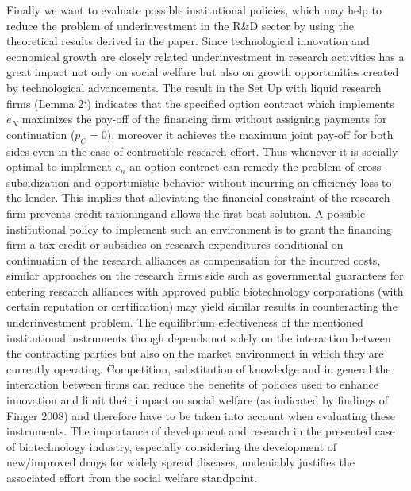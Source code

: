 Finally we want to evaluate possible institutional policies, which may help to reduce the problem of underinvestment in the R\&D sector by using the theoretical results derived in the paper. Since technological innovation and economical growth are closely related underinvestment in research activities has a great impact not only on social welfare but also on growth opportunities created by technological advancements. The result in the Set Up with liquid research firms (Lemma 2`) indicates that the specified option contract  which implements $e_N$ maximizes the pay-off of the financing firm without assigning payments for continuation ($p_C = 0$), moreover it achieves the maximum joint pay-off for both sides even in the case of contractible research effort. Thus whenever it is socially optimal to implement $e_n$  an option contract can remedy the problem of cross-subsidization and opportunistic behavior without incurring an efficiency loss to the lender. This implies that alleviating the financial constraint of the research firm prevents \grqq credit rationing\grqq and allows the first best solution. A possible institutional policy to implement such an environment is to grant the financing firm a tax credit or subsidies on research expenditures conditional on continuation of the research alliances as compensation for the incurred costs, similar approaches on the research firms side such as governmental guarantees for entering research alliances with approved public biotechnology corporations (with certain reputation or certification) may yield similar results in counteracting the underinvestment problem. The equilibrium effectiveness of the mentioned institutional instruments though depends not solely on the interaction between the contracting parties but also on the market environment in which they are currently operating. Competition, substitution of knowledge and in general the interaction between firms can reduce the benefits of policies used to enhance innovation and limit their impact on social welfare (as indicated by findings of Finger 2008) and therefore have to be taken into account when evaluating these instruments. The importance of development and research in the presented case of biotechnology industry, especially considering the development of new/improved drugs for widely spread diseases, undeniably justifies the associated effort from the social welfare standpoint.








